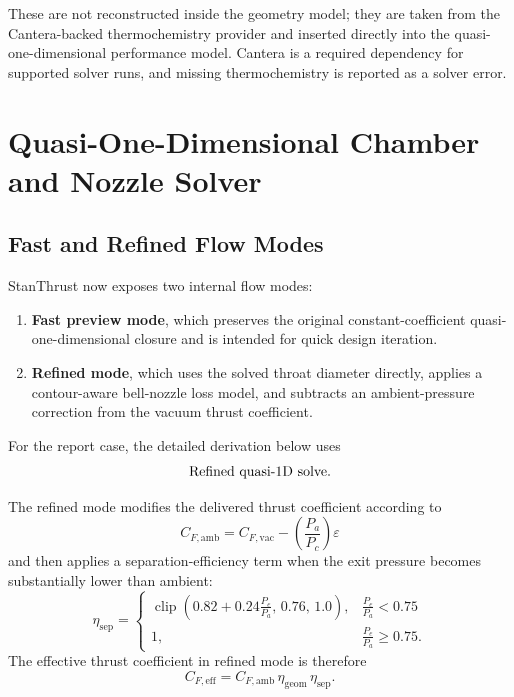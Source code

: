 \documentclass[11pt]{article}
\newcommand{\clip}{\operatorname{clip}}
\begin{document}
These are not reconstructed inside the geometry model; they are taken from the Cantera-backed thermochemistry provider and inserted directly into the quasi-one-dimensional performance model. Cantera is a required dependency for supported solver runs, and missing thermochemistry is reported as a solver error.

\section{Quasi-One-Dimensional Chamber and Nozzle Solver}
\subsection{Fast and Refined Flow Modes}
StanThrust now exposes two internal flow modes:
\begin{enumerate}[leftmargin=6mm]
\item \textbf{Fast preview mode}, which preserves the original constant-coefficient quasi-one-dimensional closure and is intended for quick design iteration.
\item \textbf{Refined mode}, which uses the solved throat diameter directly, applies a contour-aware bell-nozzle loss model, and subtracts an ambient-pressure correction from the vacuum thrust coefficient.
\end{enumerate}

For the report case, the detailed derivation below uses
\[
\text{Refined quasi-1D solve}.
\]

The refined mode modifies the delivered thrust coefficient according to
\begin{equation}
C_{F,\mathrm{amb}} = C_{F,\mathrm{vac}} - \left(\frac{P_a}{P_c}\right)\varepsilon
\label{eq:cf-ambient}
\end{equation}
and then applies a separation-efficiency term when the exit pressure becomes substantially lower than ambient:
\begin{equation}
\eta_{\mathrm{sep}}=
\begin{cases}
\clip\!\left(0.82+0.24\frac{P_e}{P_a},\,0.76,\,1.0\right), & \frac{P_e}{P_a}<0.75\\[4pt]
1, & \frac{P_e}{P_a}\ge 0.75.
\end{cases}
\label{eq:separation-efficiency}
\end{equation}
The effective thrust coefficient in refined mode is therefore
\begin{equation}
C_{F,\mathrm{eff}} = C_{F,\mathrm{amb}}\,\eta_{\mathrm{geom}}\,\eta_{\mathrm{sep}}.
\label{eq:cf-refined}
\end{equation}
\end{document}
